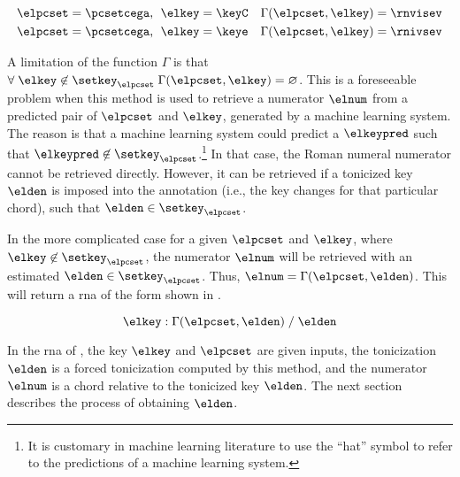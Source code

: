 \begin{equation}
    \label{eq:numerator_from_pcset_key}
    \begin{split}
        \elpcset = \pcsetcega \text{, } \; \elkey = \keyC \quad \Gamma(\elpcset, \elkey) = \rnvisev \\
        \elpcset = \pcsetcega \text{, } \; \elkey = \keye \quad \Gamma(\elpcset, \elkey) = \rnivsev \\
    \end{split}
\end{equation}


A limitation of the function $\Gamma$ is that $\forall \;
\elkey \not\in \setkey_\elpcset \; \Gamma(\elpcset, \elkey)
= \varnothing$. This is a foreseeable problem when this
method is used to retrieve a numerator $\elnum$ from a
predicted pair of $\elpcset$ and $\elkey$, generated by a
machine learning system. The reason is that a machine
learning system could predict a $\elkeypred$ such that
$\elkeypred \not\in \setkey_\elpcset$.\footnote{It is
customary in machine learning literature to use the ``hat''
symbol to refer to the predictions of a machine learning
system.} In that case, the Roman numeral numerator cannot be
retrieved directly. However, it can be retrieved if a
tonicized key $\elden$ is imposed into the annotation (i.e.,
the key changes for that particular chord), such that
$\elden \in \setkey_\elpcset$.

In the more complicated case for a given $\elpcset$ and
$\elkey$, where $\elkey \not\in \setkey_\elpcset$, the
numerator $\elnum$ will be retrieved with an estimated
$\elden \in \setkey_\elpcset$. Thus, $\elnum =
\Gamma(\elpcset, \elden)$. This will return a \gls{rna} of
the form shown in .

\begin{equation}
    \label{eq:numerator_from_pcset_den}
    \elkey \; \text{:} \; \Gamma(\elpcset, \elden) \; \text{/} \; \elden
\end{equation}

In the \gls{rna} of , the
key $\elkey$ and $\elpcset$ are given inputs, the
tonicization $\elden$ is a forced tonicization computed by
this method, and the numerator $\elnum$ is a chord relative
to the tonicized key $\elden$. The next section describes
the process of obtaining $\elden$.
